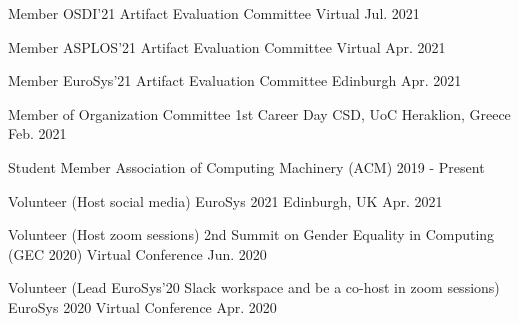 
\begin{cvhonors}
  \cvhonor
    {Member} %
    {OSDI'21 Artifact Evaluation Committee} %
    {Virtual} %
    {Jul. 2021} %

  \cvhonor
    {Member} %
    {ASPLOS'21 Artifact Evaluation Committee} %
    {Virtual} %
    {Apr. 2021} %


  \cvhonor
    {Member} %
    {EuroSys'21 Artifact Evaluation Committee} %
    {Edinburgh} %
    {Apr. 2021} %
	
  \cvhonor
    {Member of Organization Committee} %
    {1st Career Day CSD, UoC} %
    {Heraklion, Greece} %
    {Feb. 2021} %

  \cvhonor
    {Student Member} %
    {Association of Computing Machinery (ACM)} %
    {} %
    {2019 - Present} %

  \cvhonor
    {Volunteer (Host social media)} %
    {EuroSys 2021} %
    {Edinburgh, UK} %
    {Apr. 2021} %

  \cvhonor
    {Volunteer (Host zoom sessions)} %
    {2nd Summit on Gender Equality in Computing (GEC 2020)} %
    {Virtual Conference} %
    {Jun. 2020} %


  \cvhonor
    {Volunteer (Lead EuroSys'20 Slack workspace and be a co-host in
    zoom sessions)} %
    {EuroSys 2020} %
    {Virtual Conference} %
    {Apr. 2020} %



\end{cvhonors}
